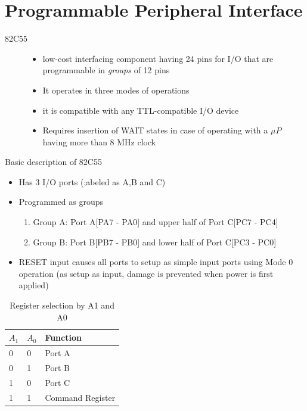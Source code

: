 \section{Programmable Peripheral Interface}
\begin{description}
  \item[82C55]
  \begin{itemize}
    \item low-cost interfacing component having 24 pins for I/O that are programmable in \textit{groups} of 12 pins
    \item It operates in three modes of operations
    \item it is compatible with any TTL-compatible I/O device
    \item Requires insertion of WAIT states in case of operating with a $\mu P$ having more than 8 MHz clock
  \end{itemize}
\end{description}

Basic description of 82C55
\begin{itemize}
  \item Has 3 I/O ports (;abeled as A,B and C)
  \item Programmed as groups
  \begin{enumerate}
    \item Group A: Port A[PA7 - PA0] and upper half of Port C[PC7 - PC4]
    \item Group B: Port B[PB7 - PB0] and lower half of Port C[PC3 - PC0]
  \end{enumerate}
  \item RESET input causes all ports to setup as simple input ports using Mode 0 operation (as setup as input, damage is prevented when power is first applied)
\end{itemize}
\begin{table}[h!]
\centering
\begin{tabular}{ |p{1cm}|p{1cm}|p{3cm}|  }
\hline
$A_1$ & $A_0$ & Function   \\
\hline
0 & 0 & Port A \\
0 & 1 & Port B \\
1 & 0 & Port C \\
1 & 1 & Command Register \\
\hline
\end{tabular}
\caption{Register selection by A1 and A0}
\label{table:11}
\end{table}

